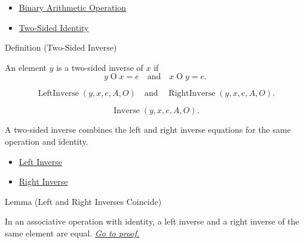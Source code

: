 \begin{dependencies}
\begin{itemize}
  \item \hyperref[def:binary-arithmetic-operation]{Binary Arithmetic Operation}
  \item \hyperref[def:two-sided-identity]{Two-Sided Identity}
\end{itemize}
\end{dependencies}

\begin{definitionbox}{Definition (Two-Sided Inverse)}
\begin{definition}
\label{def:two-sided-inverse}
An element $y$ is a two-sided inverse of $x$ if
\[
y\mathbin{O}x=e
\quad\text{and}\quad
x\mathbin{O}y=e.
\]
\end{definition}
\end{definitionbox}

\begin{remark*}
\[
\operatorname{LeftInverse}(y,x,e,A,O)
\quad\text{and}\quad
\operatorname{RightInverse}(y,x,e,A,O).
\]
\end{remark*}

\begin{remark*}
\[
\operatorname{Inverse}(y,x,e,A,O).
\]
\end{remark*}

\begin{remark*}[Interpretation]
A two-sided inverse combines the left and right inverse equations for the same
operation and identity.
\end{remark*}

\begin{dependencies}
\begin{itemize}
  \item \hyperref[def:left-inverse]{Left Inverse}
  \item \hyperref[def:right-inverse]{Right Inverse}
\end{itemize}
\end{dependencies}

\begin{lemmabox}{Lemma (Left and Right Inverses Coincide)}
\begin{lemma}
\label{lem:left-right-inverses-coincide}
In an associative operation with identity, a left inverse and a right inverse
of the same element are equal.
\hyperref[prf:left-right-inverses-coincide]{\textit{Go to proof.}}
\end{lemma}
\end{lemmabox}

